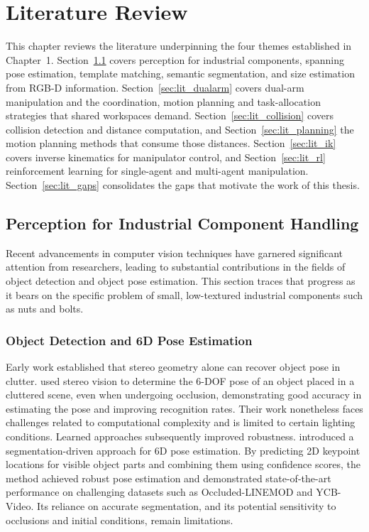 \chapter{Literature Review}
\label{chap:lit_review}

This chapter reviews the literature underpinning the four themes established in Chapter~1.
Section~\ref{sec:lit_perception} covers perception for industrial components, spanning pose
estimation, template matching, semantic segmentation, and size estimation from RGB-D information.
Section~\ref{sec:lit_dualarm} covers dual-arm manipulation and the coordination, motion planning and task-allocation strategies that shared workspaces demand. Section~\ref{sec:lit_collision} covers collision detection and distance computation, and Section~\ref{sec:lit_planning} the motion planning methods that consume those distances. Section~\ref{sec:lit_ik} covers inverse kinematics for manipulator control, and Section~\ref{sec:lit_rl} reinforcement learning for single-agent and multi-agent manipulation. Section~\ref{sec:lit_gaps} consolidates the gaps that motivate the work of this thesis.

\section{Perception for Industrial Component Handling}\label{sec:lit_perception}

Recent advancements in computer vision techniques have garnered significant attention from
researchers, leading to substantial contributions in the fields of object detection and object pose
estimation. This section traces that progress as it bears on the specific problem of small, low-textured industrial components such as nuts and bolts.

\subsection{Object Detection and 6D Pose Estimation}\label{subsec:lit_pose}

Early work established that stereo geometry alone can recover object pose in clutter.
\citet{sumi2002object} used stereo vision to determine the 6-DOF pose of an object placed in a
cluttered scene, even when undergoing occlusion, demonstrating good accuracy in estimating the pose
and improving recognition rates. Their work nonetheless faces challenges related to computational
complexity and is limited to certain lighting conditions. Learned approaches subsequently improved robustness. \citet{hu2018segmentation} introduced a segmentation-driven approach for 6D pose estimation. By predicting 2D keypoint locations for visible object parts and combining them using confidence scores, the method achieved robust pose estimation and demonstrated state-of-the-art performance on challenging datasets such as Occluded-LINEMOD and YCB-Video. Its reliance on accurate segmentation, and its potential sensitivity to occlusions and initial conditions, remain limitations.

